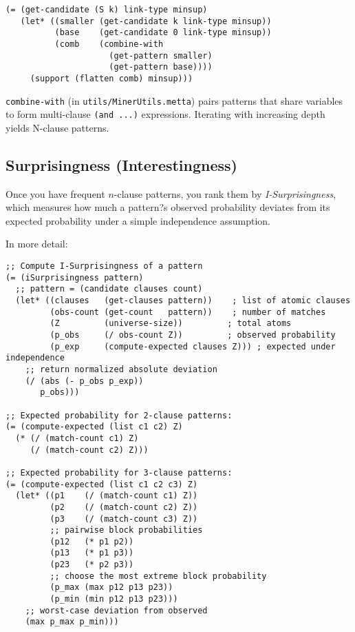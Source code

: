 \documentclass{article}
\begin{document}
\begin{verbatim}
(= (get-candidate (S k) link-type minsup)
   (let* ((smaller (get-candidate k link-type minsup))
          (base    (get-candidate 0 link-type minsup))
          (comb    (combine-with
                     (get-pattern smaller)
                     (get-pattern base))))
     (support (flatten comb) minsup)))
\end{verbatim}

\texttt{combine-with} (in \texttt{utils/MinerUtils.metta}) pairs patterns that share variables to form multi-clause \verb|(and ...)| expressions.  Iterating with increasing depth yields N-clause patterns.

\subsection{Surprisingness (Interestingness)}

Once you have frequent $n$-clause patterns, you rank them by \emph{I-Surprisingness}, which measures how much a pattern?s observed probability deviates from its expected probability under a simple independence assumption.  

In more detail:

\begin{verbatim}
;; Compute I-Surprisingness of a pattern
(= (iSurprisingness pattern)
  ;; pattern = (candidate clauses count)
  (let* ((clauses   (get-clauses pattern))    ; list of atomic clauses
         (obs-count (get-count   pattern))    ; number of matches
         (Z         (universe-size))         ; total atoms
         (p_obs     (/ obs-count Z))         ; observed probability
         (p_exp     (compute-expected clauses Z))) ; expected under independence
    ;; return normalized absolute deviation
    (/ (abs (- p_obs p_exp))
       p_obs)))

;; Expected probability for 2-clause patterns:
(= (compute-expected (list c1 c2) Z)
  (* (/ (match-count c1) Z)
     (/ (match-count c2) Z)))

;; Expected probability for 3-clause patterns:
(= (compute-expected (list c1 c2 c3) Z)
  (let* ((p1    (/ (match-count c1) Z))
         (p2    (/ (match-count c2) Z))
         (p3    (/ (match-count c3) Z))
         ;; pairwise block probabilities
         (p12   (* p1 p2))
         (p13   (* p1 p3))
         (p23   (* p2 p3))
         ;; choose the most extreme block probability
         (p_max (max p12 p13 p23))
         (p_min (min p12 p13 p23)))
    ;; worst-case deviation from observed
    (max p_max p_min)))
\end{verbatim}
\end{document}
